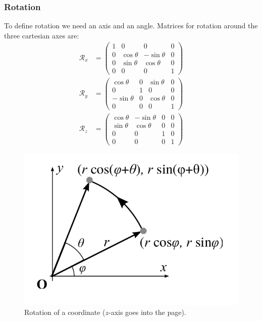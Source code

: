 \documentclass[11pt]{article}
\begin{document}
\subsubsection{Rotation}
To define rotation we need an axis and an angle.
Matrices for rotation around the three cartesian axes are:
\begin{align*}
  \mathcal{R}_x &=
  \begin{pmatrix}
    1 & 0 & 0 & 0 \\
    0 & \cos \theta & -\sin \theta & 0 \\
    0 & \sin \theta & \cos \theta & 0 \\
    0 & 0 & 0 & 1
  \end{pmatrix} \\
  \mathcal{R}_y &=
  \begin{pmatrix}
    \cos \theta & 0 & \sin \theta & 0 \\
    0 & 1 & 0 & 0 \\
    -\sin \theta & 0 & \cos \theta & 0 \\
    0 & 0 & 0 & 1
  \end{pmatrix} \\
  \mathcal{R}_z &=
  \begin{pmatrix}
    \cos \theta &  -\sin \theta & 0 & 0 \\
    \sin \theta & \cos \theta & 0 & 0 \\
    0 & 0 & 1 & 0 \\
    0 & 0 & 0 & 1
  \end{pmatrix}
\end{align*}

\begin{figure}[h]
  \caption{Rotation of a coordinate ($z$-axis goes into the page).}
  \includegraphics[scale=0.3]{deriverotate}
  \centering
\end{figure}
\end{document}
